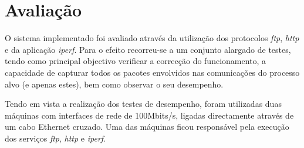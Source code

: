 









\section{Avaliação}
\label{sec:evaluation}

O sistema implementado foi avaliado através da utilização dos protocolos \textit{ftp}, \textit{http} e da aplicação \textit{iperf}\cite{iperf}.
Para o efeito recorreu-se a um conjunto alargado de testes, tendo como principal objectivo verificar a correcção do funcionamento, a capacidade de capturar todos os pacotes envolvidos nas comunicações do processo alvo (e apenas estes), bem como observar o seu desempenho.

Tendo em vista a realização dos testes de desempenho, foram utilizadas duas máquinas com interfaces de rede de 100Mbits/s, ligadas directamente através de um cabo Ethernet cruzado.
Uma das máquinas ficou responsável pela execução dos serviços \textit{ftp}, \textit{http} e \textit{iperf}.

